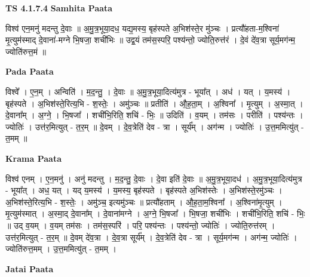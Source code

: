 \documentclass[17pt]{extarticle}
\begin{document}
\textbf{TS 4.1.7.4 } \newline
\textbf{Samhita Paata} \newline

विश्व॑ एन॒मनु॑ मदन्तु दे॒वाः ॥ अ॒मु॒त्र॒भूया॒दध॒ यद्य॒मस्य॒ बृह॑स्पते अ॒भिश॑स्ते॒र मु॑ञ्चः । प्रत्यौ॑हता-म॒श्विना॑ मृ॒त्युम॑स्माद् दे॒वाना॑-मग्ने भि॒षजा॒ शची॑भिः ॥ उद्व॒यं तम॑स॒स्परि॒ पश्य॑न्तो॒ ज्योति॒रुत्त॑रं । दे॒वं दे॑व॒त्रा सूर्य॒मग॑न्म॒ ज्योति॑रुत्त॒मं ॥ \newline

\textbf{Pada Paata} \newline

विश्वे᳚ । ए॒न॒म् । अन्विति॑ । म॒द॒न्तु॒ । दे॒वाः ॥ अ॒मु॒त्र॒भूया॒दित्य॑मुत्र - भूया᳚त् । अध॑ । यत् । य॒मस्य॑ । बृह॑स्पते । अ॒भिश॑स्ते॒रित्य॒भि - श॒स्तेः॒ । अमु॑ञ्चः ॥ प्रतीति॑ । औ॒ह॒ता॒म् । अ॒श्विना᳚ । मृ॒त्युम् । अ॒स्मा॒त् । दे॒वाना᳚म् । अ॒ग्ने॒ । भि॒षजा᳚ । शची॑भि॒रिति॒ शचि॑ - भिः॒ ॥ उदिति॑ । व॒यम् । तम॑सः । परीति॑ । पश्य॑न्तः । ज्योतिः॑ । उत्त॑र॒मित्युत् - त॒र॒म् ॥ दे॒वम् । दे॒व॒त्रेति॑ देव - त्रा । सूर्य᳚म् । अग॑न्म । ज्योतिः॑ । उ॒त्त॒ममित्यु॑त् - त॒मम् ॥  \newline


\textbf{Krama Paata} \newline

विश्व॑ एनम् । ए॒न॒मनु॑ । अनु॑ मदन्तु । म॒द॒न्तु॒ दे॒वाः । दे॒वा इति॑ दे॒वाः ॥ अ॒मु॒त्र॒भूया॒दध॑ । अ॒मु॒त्र॒भूया॒दित्य॑मुत्र - भूया᳚त् । अध॒ यत् । यद् य॒मस्य॑ । य॒मस्य॒ बृह॑स्पते । बृह॑स्पते अ॒भिश॑स्तेः । अ॒भिश॑स्ते॒रमु॑ञ्चः । अ॒भिश॑स्ते॒रित्य॒भि - श॒स्तेः॒ । अमु॑ञ्च॒ इत्यमु॑ञ्चः ॥ प्रत्यौ॑हताम् । औ॒ह॒ता॒म॒श्विना᳚ । अ॒श्विना॑मृ॒त्युम् । मृ॒त्युम॑स्मात् । अ॒स्मा॒द् दे॒वाना᳚म् । दे॒वाना॑मग्ने । अ॒ग्ने॒ भि॒षजा᳚ । भि॒षजा॒ शची॑भिः । शची॑भि॒रिति॒ शचि॑ - भिः॒ ॥ उद् व॒यम् । व॒यम् तम॑सः । तम॑स॒स्परि॑ । परि॒ पश्य॑न्तः । पश्य॑न्तो॒ ज्योतिः॑ । ज्योति॒रुत्त॑रम् । उत्त॑र॒मित्युत् - त॒र॒म् ॥ दे॒वम् दे॑व॒त्रा । दे॒व॒त्रा सूर्य᳚म् । दे॒व॒त्रेति॑ देव - त्रा । सूर्य॒मग॑न्म । अग॑न्म॒ ज्योतिः॑ । ज्योति॑रुत्त॒मम् । उ॒त्त॒ममित्यु॑त् - त॒मम् । \newline

\textbf{Jatai Paata} \newline
\end{document}

